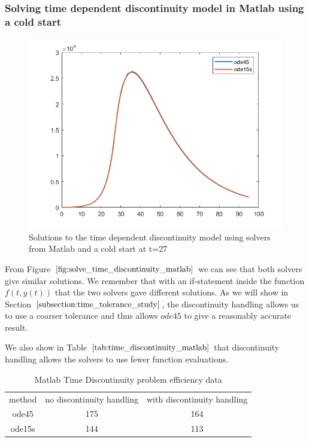 \subsubsection{Solving time dependent discontinuity model in Matlab using a cold start}
\begin{figure}[H]
\centering
\includegraphics[width=0.7\linewidth]{./figures/solve_time_discontinuity_matlab}
\caption{Solutions to the time dependent discontinuity model using solvers from Matlab and a cold start at t=27}
\label{fig:solve_time_discontinuity_matlab}
\end{figure}

From Figure $\ref{fig:solve_time_discontinuity_matlab}$ we can see that both solvers give similar solutions. We remember that with an if-statement inside the function $f(t, y(t))$ that the two solvers gave different solutions. As we will show in Section $\ref{subsection:time_tolerance_study}$, the discontinuity handling allows us to use a coarser tolerance and thus allows $ode45$ to give a reasonably accurate result.

We also show in Table $\ref{tab:time_discontinuity_matlab}$ that discontinuity handling allows the solvers to use fewer function evaluations.

\begin{table}[H]
\caption {Matlab Time Discontinuity problem efficiency data} 
\label{tab:time_discontinuity_matlab} 
\begin{center}
\begin{tabular}{ c c c }
method & no discontinuity handling & with discontinuity handling \\ 
ode45 & 175 & 164 \\
ode15s & 144 & 113 \\
\end{tabular}
\end{center}
\end{table}

